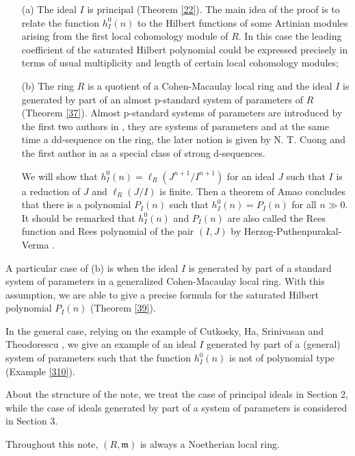 \documentclass{amsart}
\theoremstyle {definition}
\theoremstyle {remark}
\begin{document}
\begin{enumerate}
\item[(a)] The ideal $I$ is principal (Theorem \ref{22}). The main idea of the proof is to relate the function $h^0_I(n)$ to the Hilbert functions of some Artinian modules arising from the first local cohomology module of $R$. In this case the leading coefficient of the saturated Hilbert polynomial could be expressed precisely in terms of usual multiplicity and length of certain local cohomology modules;

\item[(b)] The ring $R$ is a quotient of a Cohen-Macaulay local ring  and the ideal $I$ is generated by part of an almost p-standard system of parameters of $R$ (Theorem \ref{37}). Almost p-standard systems of parameters are introduced by the first two authors in \cite{DTCNam}, they are systems of parameters and at the same time a dd-sequence on the ring, the later notion is given by N. T. Cuong and the first author in \cite{NTCDTC1} as a special class of strong d-sequences.

We will show that $h^0_I(n)=\ell_R(J^{n+1}/I^{n+1})$ for an ideal $J$ such that $I$ is a reduction of $J$ and $\ell_R(J/I)$ is finite. Then a theorem of Amao \cite{AMAO} concludes that there is a polynomial $P_I(n)$ such that $h^0_I(n)=P_I(n)$ for all $n\gg 0$. It should be remarked that $h^0_I(n)$ and $P_I(n)$ are also called the Rees function and Rees polynomial of the pair $(I, J)$ by Herzog-Puthenpurakal-Verma \cite{HPV}.
\end{enumerate}

A particular case of (b) is when the ideal $I$ is generated by part of a standard system of parameters in a generalized Cohen-Macaulay local ring. With this assumption, we are able to give a precise formula for the saturated Hilbert polynomial $P_I(n)$ (Theorem \ref{39}).

In the general case, relying on the example of Cutkosky, Ha, Srinivasan and Theodorescu \cite[Theorem 2.2]{CTST}, we give an example of an ideal $I$ generated by part of a (general) system of parameters such that the function $h^0_I(n)$ is not of polynomial type (Example \ref{310}).

About the structure of the note, we treat the case of principal ideals in Section 2, while the case of ideals generated by part of a system of parameters is considered in Section 3.

Throughout this note, $(R, {\ensuremath{\mathfrak m}})$ is always a Noetherian local ring.
\end{document}
